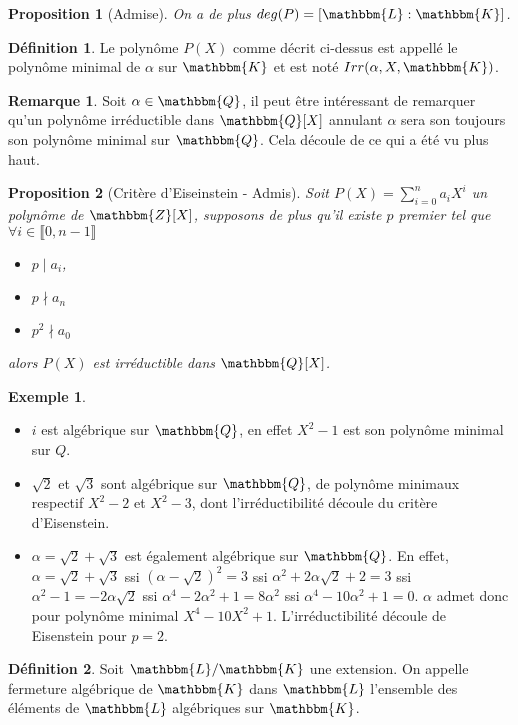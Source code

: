 \documentclass[12pt]{article}
\newcommand{\jL}{\mathbbm{L}}
\newcommand{\Z}{\mathbbm{Z}}
\newcommand{\Q}{\mathbbm{Q}}
\newcommand{\K}{\mathbbm{K}}
\newtheorem{prop}{Proposition}
\theoremstyle{definition}\newtheorem{defn}{Définition}
\theoremstyle{definition}\newtheorem{exm}{Exemple}
\theoremstyle{definition}\newtheorem{rem}{Remarque}
\theoremstyle{definition}\newtheorem{algo}{Algorithme}
\theoremstyle{remark}\newtheorem{exo}{Exercice}
\theoremstyle{remark}\newtheorem{nota}{Notation}
\begin{document}
\begin{prop}[Admise]
On a de plus $deg(P) = [\jL : \K]$.
\end{prop}

\begin{defn}
Le polynôme $P(X)$ comme décrit ci-dessus est appellé le polynôme minimal de $\alpha$ sur $\K$ et est noté $Irr(\alpha,X,\K)$.
\end{defn}

\begin{rem}
Soit $\alpha \in \Q$, il peut être intéressant de remarquer qu'un polynôme irréductible dans $\Q[X]$ annulant $\alpha$ sera son toujours son polynôme minimal sur $\Q$. Cela découle de ce qui a été vu plus haut.
\end{rem}

\begin{prop}[Critère d'Eiseinstein - Admis]
Soit $P(X) = \displaystyle \sum_{i=0}^{n}a_iX^i$ un polynôme de $\Z[X]$, supposons de plus qu'il existe $p$ premier tel que $\forall i \in \llbracket 0, n-1 \rrbracket$
\begin{itemize}
	\item $p \mid a_i$, 
	\item $p \nmid a_n$
	\item $p^2 \nmid a_0$
\end{itemize}
alors $P(X)$ est irréductible dans $\Q[X]$.
\end{prop}

\begin{exm}
	\begin{itemize} Voyons quelques cas triviaux:
		\item $i$ est algébrique sur $\Q$, en effet $X^2-1$ est son polynôme minimal sur $Q$.
		\item $\sqrt2$ et $\sqrt3$ sont algébrique sur $\Q$, de polynôme minimaux respectif $X^2 -2$ et $X^2-3$, dont l'irréductibilité découle du critère d'Eisenstein.
		\item $\alpha = \sqrt2 + \sqrt3$ est également algébrique sur $\Q$. En effet, $\alpha = \sqrt2 + \sqrt3$ ssi $(\alpha-\sqrt2)^2= 3$ ssi $\alpha^2 + 2\alpha\sqrt2 + 2 = 3$ ssi $\alpha^2 - 1 =  -2\alpha\sqrt2$ ssi $\alpha^4 - 2\alpha^2 +1 =  8\alpha^2$ ssi $\alpha^4 - 10\alpha^2 +1 = 0$. $\alpha$ admet donc pour polynôme minimal $X^4 -10X^2 +1$. L'irréductibilité découle de Eisenstein pour $p=2$.	
	\end{itemize}
\end{exm}

\begin{defn}
Soit $\jL / \K$ une extension. On appelle fermeture algébrique de $\K$ dans $\jL$ l'ensemble des éléments de $\jL$ algébriques sur $\K$.
\end{defn}
\end{document}
